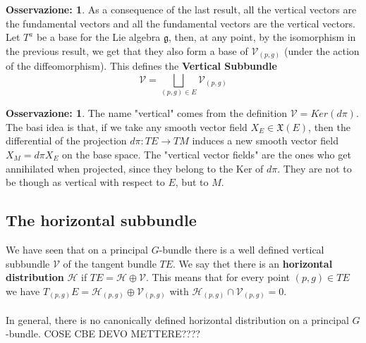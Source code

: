 \documentclass[12pt,a4paper]{report}
\theoremstyle{definition}
\theoremstyle{Theorem}
\theoremstyle{definition}
\theoremstyle{definition}
\theoremstyle{definition}
\newtheorem{Obs}[Def]{Osservazione:}
\begin{document}
		\begin{Obs}
			As a consequence of the last result, all the vertical vectors are the fundamental vectors and all the fundamental vectors are the vertical vectors.\\
			Let $T^a$ be a base for the Lie algebra $\mathfrak{g}$, then, at any point, by the isomorphism in the previous result, we get that they also form a base of $\mathcal{V}_{(p,g)}$ (under the action of the diffeomorphism). This defines the \textbf{Vertical Subbundle} $$\mathcal{V}=\bigsqcup_{(p,g)\in E}\mathcal{V}_{(p,g)}$$
		\end{Obs}
		\begin{Obs}
			The name "vertical" comes from the definition $\mathcal{V}=Ker(d\pi)$. The basi idea is that, if we take any smooth vector field $X_E\in\mathfrak{X}(E)$, then the differential of the projection $d\pi:TE\rightarrow TM$ induces a new smooth vector field $X_M=d\pi X_E$ on the base space. The "vertical vector fields" are the ones who get annihilated when projected, since they belong to the Ker of $d\pi$. They are not to be though as vertical with respect to $E$, but to $M$.
		\end{Obs}
		\subsection{The horizontal subbundle}
		We have seen that on a principal $G$-bundle there is a well defined vertical subbundle $\mathcal{V}$ of the tangent bundle $TE$. We say thet there is an \textbf{horizontal distribution} $\mathcal{H}$ if $TE=\mathcal{H}\oplus\mathcal{V}$. This means that for every point $(p,g)\in TE$ we have $T_{(p,g)}E=\mathcal{H}_{(p,g)}\oplus\mathcal{V}_{(p,g)}$ with $\mathcal{H}_{(p,g)}\cap\mathcal{V}_{(p,g)}=0$.\\
		\\
		In general, there is no canonically defined horizontal distribution on a principal $G$-bundle.
		COSE CBE DEVO METTERE????
\end{document}
